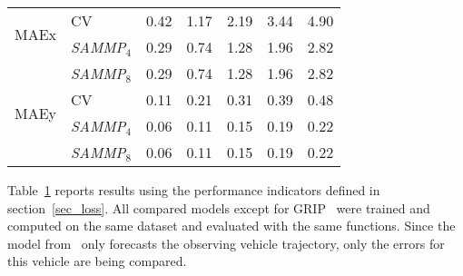 \documentclass[a4paper, 10pt, conference]{ieeeconf}      %
\begin{document}
\begin{table}
\begin{tabular}{l|l|ccccc}
        \hline
        \multirow{2}{*}{\hspace{-5pt}MAEx\hspace{-3pt}}&\hspace{-3pt}CV~\cite{Mercat2019}      & 0.42 & 1.17 & 2.19 & 3.44 & 4.90\\
                              &\hspace{-3pt}\textit{SAMMP$_4$}           & 0.29 & 0.74 & 1.28 & 1.96 & 2.82\\
                              &\hspace{-3pt}\textit{SAMMP$_8$}           & 0.29 & 0.74 & 1.28 & 1.96 & 2.82\\
        \hline
        \multirow{2}{*}{\hspace{-5pt}MAEy\hspace{-3pt}}&\hspace{-3pt}CV~\cite{Mercat2019}      & 0.11 & 0.21 & 0.31 & 0.39 & 0.48\\
                              &\hspace{-3pt}\textit{SAMMP$_4$}           & 0.06 & 0.11 & 0.15 & 0.19 & 0.22 \\
                              &\hspace{-3pt}\textit{SAMMP$_8$}           & 0.06 & 0.11 & 0.15 & 0.19 & 0.22 \\
        \hline
    \end{tabular}
    \label{tab_perf}
    \vspace{-10pt}
\end{table}

Table~\ref{tab_perf} reports results using the performance indicators defined in section~\ref{sec_loss}.
All compared models except for GRIP~\cite{Li2019} were trained and computed on the same dataset and evaluated with the same functions.
Since the model from~\cite{Deo2018} only forecasts the observing vehicle trajectory, only the errors for this vehicle are
being compared.
\end{document}
